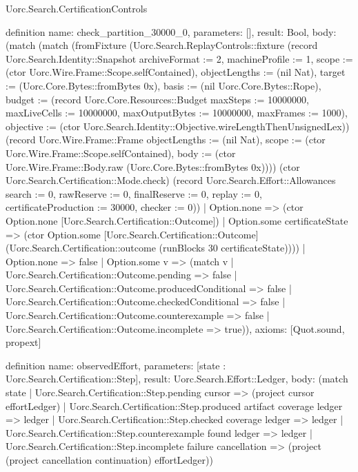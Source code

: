 \begin{lexlean}{Uorc.Search.CertificationControls}
\begin{semanticmodule}
definition{
  name: check_partition_30000_0,
  parameters: [],
  result: Bool,
  body: (match (match (fromFixture (Uorc.Search.ReplayControls::fixture (record Uorc.Search.Identity::Snapshot {archiveFormat := 2, machineProfile := 1, scope := (ctor Uorc.Wire.Frame::Scope.selfContained), objectLengths := (nil Nat), target := (Uorc.Core.Bytes::fromBytes 0x), basis := (nil Uorc.Core.Bytes::Rope), budget := (record Uorc.Core.Resources::Budget {maxSteps := 10000000, maxLiveCells := 10000000, maxOutputBytes := 10000000, maxFrames := 1000}), objective := (ctor Uorc.Search.Identity::Objective.wireLengthThenUnsignedLex)}) (record Uorc.Wire.Frame::Frame {objectLengths := (nil Nat), scope := (ctor Uorc.Wire.Frame::Scope.selfContained), body := (ctor Uorc.Wire.Frame::Body.raw (Uorc.Core.Bytes::fromBytes 0x))})) (ctor Uorc.Search.Certification::Mode.check) (record Uorc.Search.Effort::Allowances {search := 0, rawReserve := 0, finalReserve := 0, replay := 0, certificateProduction := 30000, checker := 0}))
      | Option.none => (ctor Option.none [Uorc.Search.Certification::Outcome])
      | Option.some certificateState => (ctor Option.some [Uorc.Search.Certification::Outcome] (Uorc.Search.Certification::outcome (runBlocks 30 certificateState))))
    | Option.none => false
    | Option.some v => (match v
      | Uorc.Search.Certification::Outcome.pending => false
      | Uorc.Search.Certification::Outcome.producedConditional => false
      | Uorc.Search.Certification::Outcome.checkedConditional => false
      | Uorc.Search.Certification::Outcome.counterexample => false
      | Uorc.Search.Certification::Outcome.incomplete => true)),
  axioms: [Quot.sound, propext]
}

definition{
  name: observedEffort,
  parameters: [state : Uorc.Search.Certification::Step],
  result: Uorc.Search.Effort::Ledger,
  body: (match state
    | Uorc.Search.Certification::Step.pending cursor => (project cursor effortLedger)
    | Uorc.Search.Certification::Step.produced artifact coverage ledger => ledger
    | Uorc.Search.Certification::Step.checked coverage ledger => ledger
    | Uorc.Search.Certification::Step.counterexample found ledger => ledger
    | Uorc.Search.Certification::Step.incomplete failure cancellation => (project (project cancellation continuation) effortLedger))
}


\end{semanticmodule}
\end{lexlean}
